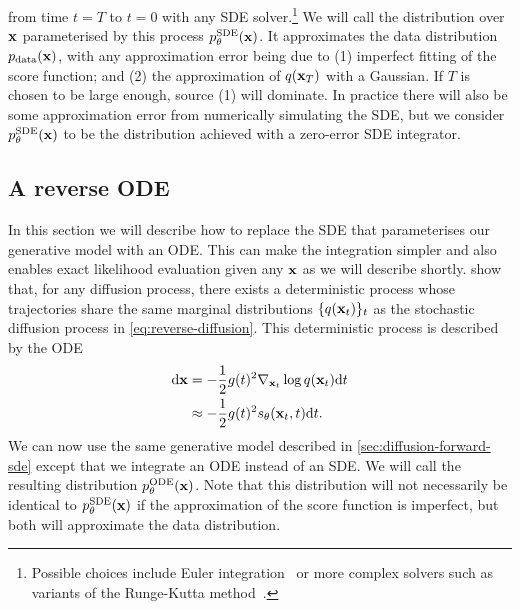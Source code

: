 from time $t=T$ to $t=0$ with any SDE solver.\footnote{Possible choices include Euler integration~\citep{ho2020denoising} or more complex solvers such as variants of the Runge-Kutta method~\citep{debrabant2009families,grathwohl2018ffjord}.} We will call the distribution over ${\mathbf{x}}$ parameterised by this process $p_\theta^\text{SDE}({\mathbf{x}})$. It approximates the data distribution $p_{\rm{data}}({\mathbf{x}})$, with any approximation error being due to (1) imperfect fitting of the score function; and (2) the approximation of $q({\mathbf{x}}_T)$ with a Gaussian. If $T$ is chosen to be large enough, source (1) will dominate. In practice there will also be some approximation error from numerically simulating the SDE, but we consider $p_\theta^\text{SDE}({\mathbf{x}})$ to be the distribution achieved with a zero-error SDE integrator.


\subsection{A reverse ODE} \label{sec:diffusion-ode}
In this section we will describe how to replace the SDE that parameterises our generative model with an ODE. This can make the integration simpler and also enables exact likelihood evaluation given any ${\mathbf{x}}$ as we will describe shortly. \citet{song2020score} show that, for any diffusion process, there exists a deterministic process whose trajectories share the same marginal distributions $\{q({\mathbf{x}}_t)\}_t$ as the stochastic diffusion process in \cref{eq:reverse-diffusion}. This deterministic process is described by the ODE
\begin{align}
    \mathrm{d}{\mathbf{x}} &= - \frac{1}{2} g(t)^2 \nabla_{{\mathbf{x}}_t} \log q({\mathbf{x}}_t) \mathrm{d}t \label{eq:diffusion-ode} \\
    &\approx - \frac{1}{2} g(t)^2 s_\theta({\mathbf{x}}_t, t) \mathrm{d}t. \label{eq:diffusion-ode-with-nn}
\end{align}
We can now use the same generative model described in \cref{sec:diffusion-forward-sde} except that we integrate an ODE instead of an SDE. We will call the resulting distribution $p_\theta^\text{ODE}({\mathbf{x}})$. Note that this distribution will not necessarily be identical to $p_\theta^\text{SDE}({\mathbf{x}})$ if the approximation of the score function is imperfect, but both will approximate the data distribution.

